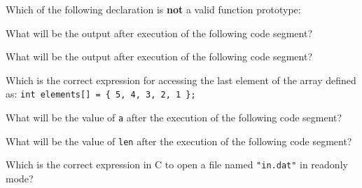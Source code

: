 \documentclass[11pt]{examdesign}
\begin{document}


\begin{multiplechoice}[title={},suppressprefix=yes,rearrange=no]
\begin{question}
Which of the following declaration is \textbf{not} a valid function prototype:
\end{question}

\begin{question}
What will be the output after execution of the following code segment?
\end{question}

\begin{question}
What will be the output after execution of the following code segment?
\end{question}

\begin{question}
Which is the correct expression for accessing the last element of the array
defined as: \texttt{int elements[] = \{ 5, 4, 3, 2, 1 \};}
\end{question}

\begin{question}
What will be the value of \texttt{a} after the execution of the following code segment?
\end{question}
  
\begin{question}
What will be the value of \texttt{len} after the execution of the following code
segment?
\end{question}
  
\begin{question}
Which is the correct expression in C to open a file named \texttt{"in.dat"} in
readonly mode?
\end{question}


\end{multiplechoice}
\end{document}
